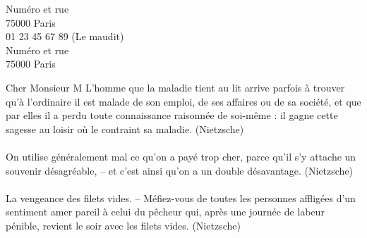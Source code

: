 \documentclass{lettre}
\begin{document}
\Large

\date{9 mai 2004}
  {Numéro et rue\\75000 Paris\\01 23 45 67 89}
  {(Le maudit)\\Numéro et rue\\75000 Paris}

\begin{corps}{Cher Monsieur M}
\og L'homme que la maladie tient au lit arrive parfois à
trouver qu'à l'ordinaire il est malade de son emploi, de
ses affaires ou de sa société, et que par elles il a perdu
toute connaissance raisonnée de soi-même : il gagne cette
sagesse au loisir où le contraint sa maladie. \fg{} (Nietzsche)\\
\\
\og On utilise généralement mal ce qu'on a payé trop cher,
    parce qu'il s'y attache un souvenir désagréable, -- et
    c'est ainsi qu'on a un double désavantage. \fg{} (Nietzsche)\\
\\
\og La vengeance des filets vides. -- Méfiez-vous de toutes
les personnes affligées d'un sentiment amer pareil à
celui du pêcheur qui, après une journée de labeur pénible,
revient le soir avec les filets vides. \fg{} (Nietzsche)
\end{corps}
\end{document}

